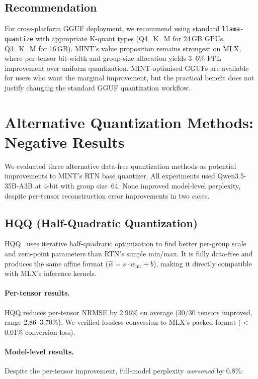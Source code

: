 \documentclass{article}
\begin{document}
\subsection{Recommendation}

For cross-platform GGUF deployment, we recommend using standard \texttt{llama-quantize} with appropriate K-quant types (Q4\_K\_M for 24\,GB GPUs, Q3\_K\_M for 16\,GB). MINT's value proposition remains strongest on MLX, where per-tensor bit-width and group-size allocation yields 3--6\% PPL improvement over uniform quantization. MINT-optimised GGUFs are available for users who want the marginal improvement, but the practical benefit does not justify changing the standard GGUF quantization workflow.

\section{Alternative Quantization Methods: Negative Results}
\label{sec:alternative_methods}

We evaluated three alternative data-free quantization methods as potential improvements to MINT's RTN base quantizer. All experiments used Qwen3.5-35B-A3B at 4-bit with group size~64. None improved model-level perplexity, despite per-tensor reconstruction error improvements in two cases.

\subsection{HQQ (Half-Quadratic Quantization)}

HQQ~\cite{badri2024hqq} uses iterative half-quadratic optimization to find better per-group scale and zero-point parameters than RTN's simple min/max. It is fully data-free and produces the same affine format ($\hat{w} = s \cdot w_{\text{int}} + b$), making it directly compatible with MLX's inference kernels.

\paragraph{Per-tensor results.} HQQ reduces per-tensor NRMSE by 2.96\% on average (30/30 tensors improved, range 2.86--3.70\%). We verified lossless conversion to MLX's packed format ($<$0.01\% conversion loss).

\paragraph{Model-level results.} Despite the per-tensor improvement, full-model perplexity \emph{worsened} by 0.8\%:
\end{document}
